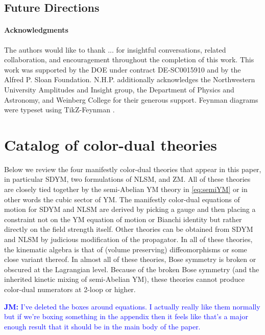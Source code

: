 \documentclass[11pt,letter]{article}
\newcommand{\jm}[1]{\textcolor{blue}{\textbf{JM: }{#1}}}
\begin{document}
\subsection{Future Directions}\label{sec:Discussion}
\paragraph{Acknowledgments} The authors would like to thank ... for insightful conversations, related collaboration, and encouragement throughout the completion of this work. This work was supported by the DOE under contract DE-SC0015910 and by the Alfred P. Sloan Foundation. N.H.P. additionally acknowledges the Northwestern University Amplitudes and Insight group, the Department of Physics and Astronomy, and Weinberg College for their generous support.
Feynman diagrams were typeset using TikZ-Feynman \cite{Ellis:2016jkw}.

\appendix
\section{Catalog of color-dual theories}
\label{sec:CKLagrangians}

Below we review the four manifestly color-dual theories that appear in this paper, in particular SDYM, two formulations of NLSM, and ZM.
All of these theories are closely tied together by the semi-Abelian YM theory in \cref{eq:semiYM} or in other words the cubic sector of YM.
The manifestly color-dual equations of motion for SDYM and NLSM are derived by picking a gauge and then placing a constraint not on the YM equation of motion or Bianchi identity but rather directly on the field strength itself.
Other theories can be obtained from SDYM and NLSM by judicious modification of the propagator.
In all of these theories, the kinematic algebra is that of (volume preserving) diffeomorphisms or some close variant thereof.
In almost all of these theories, Bose symmetry is broken or obscured at the Lagrangian level.
Because of the broken Bose symmetry (and the inherited kinetic mixing of semi-Abelian YM), these theories cannot produce color-dual numerators at 2-loop or higher.

\jm{I've deleted the boxes around equations.  I actually really like them normally but if we're boxing something in the appendix then it feels like that's a major enough result that it should be in the main body of the paper.}
\end{document}

